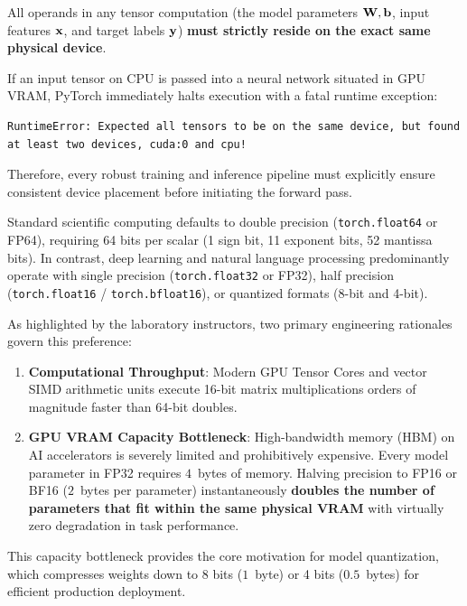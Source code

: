 \documentclass[../labs.tex]{subfiles}
\begin{document}
\begin{examinsight}
All operands in any tensor computation (the model parameters $\mathbf{W}, \mathbf{b}$, input features $\mathbf{x}$, and target labels $\mathbf{y}$) \textbf{must strictly reside on the exact same physical device}. 

If an input tensor on CPU is passed into a neural network situated in GPU VRAM, PyTorch immediately halts execution with a fatal runtime exception:
\begin{lstlisting}[style=terminalOutput]
RuntimeError: Expected all tensors to be on the same device, but found at least two devices, cuda:0 and cpu!
\end{lstlisting}
Therefore, every robust training and inference pipeline must explicitly ensure consistent device placement before initiating the forward pass.
\end{examinsight}

\begin{deepdive}
Standard scientific computing defaults to double precision (\texttt{torch.float64} or FP64), requiring 64 bits per scalar (1 sign bit, 11 exponent bits, 52 mantissa bits). In contrast, deep learning and natural language processing predominantly operate with single precision (\texttt{torch.float32} or FP32), half precision (\texttt{torch.float16} / \texttt{torch.bfloat16}), or quantized formats (8-bit and 4-bit).

As highlighted by the laboratory instructors, two primary engineering rationales govern this preference:
\begin{enumerate}
    \item \textbf{Computational Throughput}: Modern GPU Tensor Cores and vector SIMD arithmetic units execute 16-bit matrix multiplications orders of magnitude faster than 64-bit doubles.
    \item \textbf{GPU VRAM Capacity Bottleneck}: High-bandwidth memory (HBM) on AI accelerators is severely limited and prohibitively expensive. Every model parameter in FP32 requires $4$~bytes of memory. Halving precision to FP16 or BF16 ($2$~bytes per parameter) instantaneously \textbf{doubles the number of parameters that fit within the same physical VRAM} with virtually zero degradation in task performance.
\end{enumerate}
This capacity bottleneck provides the core motivation for model quantization, which compresses weights down to 8 bits ($1$~byte) or 4 bits ($0.5$~bytes) for efficient production deployment.
\end{deepdive}
\end{document}
